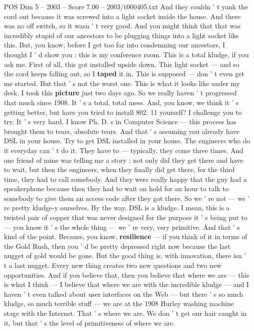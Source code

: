 \begin{textsample}{POS Dim 5 – 2003 – Score 7.00 – 2003/t000405.txt}
And they couldn ' t yank the cord out because it was screwed into a light socket inside the house.
And there was no off switch, so it wasn ' t very good.
And you might think that that was incredibly stupid of our ancestors to be plugging things into a light socket like this.
But, you know, before I get too far into condemning our ancestors, I thought I ' d show you : this is my conference room.
This is a total kludge, if you ask me.
First of all, this got installed upside down.
This light socket — and so the cord keeps falling out, so I \textbf{taped} it in.
This is supposed — don ' t even get me started.
But that ' s not the worst one.
This is what it looks like under my desk.
I took this \textbf{picture} just two days ago.
So we really haven ' t progressed that much since 1908.
It ' s a total, total mess.
And, you know, we think it ' s getting better, but have you tried to install 802. 11 yourself?
I challenge you to try.
It ' s very hard.
I know Ph.
D. s in Computer Science — this process has brought them to tears, absolute tears.
And that ' s assuming you already have DSL in your house.
Try to get DSL installed in your house.
The engineers who do it everyday can ' t do it.
They have to — typically, they come three times.
And one friend of mine was telling me a story : not only did they get there and have to wait, but then the engineers, when they finally did get there, for the third time, they had to call somebody.
And they were really happy that the guy had a speakerphone because then they had to wait on hold for an hour to talk to somebody to give them an access code after they got there.
So we ' re not — we ' re pretty kludge-y ourselves.
By the way, DSL is a kludge.
I mean, this is a twisted pair of copper that was never designed for the purpose it ' s being put to — you know it ' s the whole thing — we ' re very, very primitive.
And that ' s kind of the point.
Because, you know, \textbf{resilience} — if you think of it in terms of the Gold Rush, then you ' d be pretty depressed right now because the last nugget of gold would be gone.
But the good thing is, with innovation, there isn ' t a last nugget.
Every new thing creates two new questions and two new opportunities.
And if you believe that, then you believe that where we are — this is what I think — I believe that where we are with the incredible kludge — and I haven ' t even talked about user interfaces on the Web — but there ' s so much kludge, so much terrible stuff — we are at the 1908 Hurley washing machine stage with the Internet.
That ' s where we are.
We don ' t get our hair caught in it, but that ' s the level of primitiveness of where we are.

\end{textsample}
